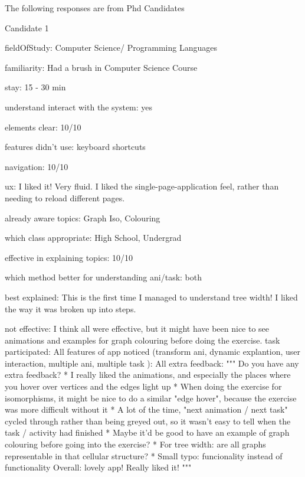 
The following responses are from Phd Candidates


Candidate 1

   fieldOfStudy: Computer Science/ Programming Languages

   familiarity: Had a brush in Computer Science Course

   stay: 15 - 30 min

   understand interact with the system: yes

   elements clear: 10/10

   features didn't use: keyboard shortcuts

   navigation: 10/10

   ux: I liked it! Very fluid. I liked the single-page-application feel, 
       rather than needing to reload different pages. 

   already aware topics: Graph Iso, Colouring

   which class appropriate: High School, Undergrad

   effective in explaining topics: 10/10

   which method better for understanding ani/task: both

   best explained: This is the first time I managed to understand 
                   tree width! I liked the way it was broken up into steps.

   not effective: I think all were effective, but it might have been nice to see animations 
                  and examples for graph colouring before doing the exercise.
   task participated: All
   features of app noticed (transform ani, dynamic explantion, user interaction, multiple ani, multiple task ): All
   extra feedback:
         """
         Do you have any extra feedback?
         * I really liked the animations, and especially the places where you hover 
           over vertices and the edges light up
         * When doing the exercise for isomorphisms, it might be nice to do a similar "edge hover", 
           because the exercise was more difficult without it
         * A lot of the time, "next animation / next task" cycled through rather than being greyed out, 
           so it wasn't easy to tell when the task / activity had finished
         * Maybe it'd be good to have an example of graph colouring before going into the exercise?
         * For tree width: are all graphs representable in that cellular structure?
         * Small typo: funcionality instead of functionality
         Overall: lovely app! Really liked it!
         """




